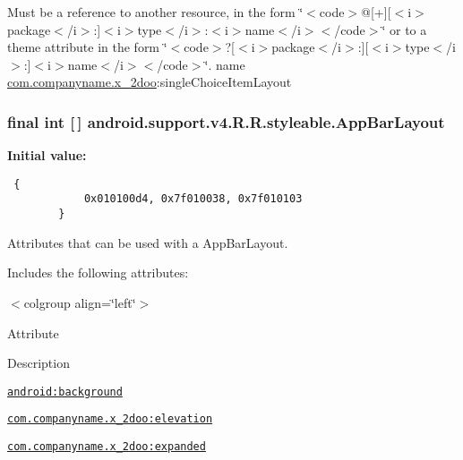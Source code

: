 Must be a reference to another resource, in the form \char`\"{}$<$code$>$@\mbox{[}+\mbox{]}\mbox{[}$<$i$>$package$<$/i$>$:\mbox{]}$<$i$>$type$<$/i$>$:$<$i$>$name$<$/i$>$$<$/code$>$\char`\"{} or to a theme attribute in the form \char`\"{}$<$code$>$?\mbox{[}$<$i$>$package$<$/i$>$:\mbox{]}\mbox{[}$<$i$>$type$<$/i$>$:\mbox{]}$<$i$>$name$<$/i$>$$<$/code$>$\char`\"{}.  name \hyperlink{namespacecom_1_1companyname_1_1x__2doo}{com.companyname.x\_\-2doo}:singleChoiceItemLayout \hypertarget{classandroid_1_1support_1_1v4_1_1_r_1_1styleable_3a761a70ae130af1cc59eb59b6d9ebab}{
\subsubsection[{AppBarLayout}]{\setlength{\rightskip}{0pt plus 5cm}final int \mbox{[}$\,$\mbox{]} android.support.v4.R.R.styleable.AppBarLayout}}
\label{classandroid_1_1support_1_1v4_1_1_r_1_1styleable_3a761a70ae130af1cc59eb59b6d9ebab}


\textbf{Initial value:}

\begin{Code}\begin{verbatim} {
            0x010100d4, 0x7f010038, 0x7f010103
        }
\end{verbatim}
\end{Code}
Attributes that can be used with a AppBarLayout. 

Includes the following attributes: \begin{TabularC}{0}
\hline
\end{TabularC}
$<$colgroup align=\char`\"{}left\char`\"{}$>$ 

Attribute

Description 

{\tt \hyperlink{classandroid_1_1support_1_1v4_1_1_r_1_1styleable_fce6e3c20cb96f7b80bda80af8f47843}{android:background}}

{\tt \hyperlink{classandroid_1_1support_1_1v4_1_1_r_1_1styleable_2f6bfe67d7eabf605f67fef684ca8ae1}{com.companyname.x\_\-2doo:elevation}}

{\tt \hyperlink{classandroid_1_1support_1_1v4_1_1_r_1_1styleable_4df0dd27ad44fc101d644efef542c6e3}{com.companyname.x\_\-2doo:expanded}}

